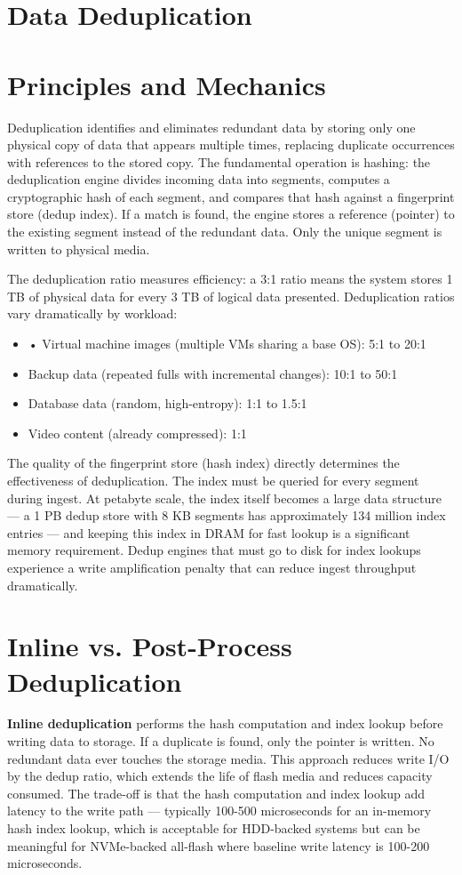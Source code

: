 \section{Data Deduplication}
\section{Principles and Mechanics}
Deduplication identifies and eliminates redundant data by storing only one physical copy of data that appears multiple times, replacing duplicate occurrences with references to the stored copy. The fundamental operation is hashing: the deduplication engine divides incoming data into segments, computes a cryptographic hash of each segment, and compares that hash against a fingerprint store (dedup index). If a match is found, the engine stores a reference (pointer) to the existing segment instead of the redundant data. Only the unique segment is written to physical media.

The deduplication ratio measures efficiency: a 3:1 ratio means the system stores 1 TB of physical data for every 3 TB of logical data presented. Deduplication ratios vary dramatically by workload:

\begin{itemize}
  \item • Virtual machine images (multiple VMs sharing a base OS): 5:1 to 20:1
  \item Backup data (repeated fulls with incremental changes): 10:1 to 50:1
  \item Database data (random, high-entropy): 1:1 to 1.5:1
  \item Video content (already compressed): 1:1
\end{itemize}

The quality of the fingerprint store (hash index) directly determines the effectiveness of deduplication. The index must be queried for every segment during ingest. At petabyte scale, the index itself becomes a large data structure --- a 1 PB dedup store with 8 KB segments has approximately 134 million index entries --- and keeping this index in DRAM for fast lookup is a significant memory requirement. Dedup engines that must go to disk for index lookups experience a write amplification penalty that can reduce ingest throughput dramatically.

\section{Inline vs. Post-Process Deduplication}
\textbf{Inline deduplication} performs the hash computation and index lookup before writing data to storage. If a duplicate is found, only the pointer is written. No redundant data ever touches the storage media. This approach reduces write I/O by the dedup ratio, which extends the life of flash media and reduces capacity consumed. The trade-off is that the hash computation and index lookup add latency to the write path --- typically 100-500 microseconds for an in-memory hash index lookup, which is acceptable for HDD-backed systems but can be meaningful for NVMe-backed all-flash where baseline write latency is 100-200 microseconds.

